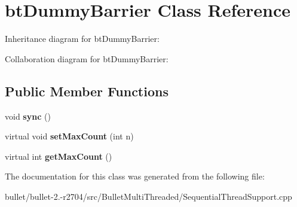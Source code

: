 \hypertarget{classbt_dummy_barrier}{\section{bt\+Dummy\+Barrier Class Reference}
\label{classbt_dummy_barrier}
}


Inheritance diagram for bt\+Dummy\+Barrier\+:


Collaboration diagram for bt\+Dummy\+Barrier\+:
\subsection*{Public Member Functions}
\begin{DoxyCompactItemize}
\item 
\hypertarget{classbt_dummy_barrier_a7ec421533b085380df3c7147bcfaa61c}{void {\bfseries sync} ()}\label{classbt_dummy_barrier_a7ec421533b085380df3c7147bcfaa61c}

\item 
\hypertarget{classbt_dummy_barrier_a44bb32b5a5e2feb46628c47491b731a1}{virtual void {\bfseries set\+Max\+Count} (int n)}\label{classbt_dummy_barrier_a44bb32b5a5e2feb46628c47491b731a1}

\item 
\hypertarget{classbt_dummy_barrier_a0525b963816e305510dde5f8ea26e20b}{virtual int {\bfseries get\+Max\+Count} ()}\label{classbt_dummy_barrier_a0525b963816e305510dde5f8ea26e20b}

\end{DoxyCompactItemize}


The documentation for this class was generated from the following file\+:\begin{DoxyCompactItemize}
\item 
bullet/bullet-\/2.-\/r2704/src/\+Bullet\+Multi\+Threaded/Sequential\+Thread\+Support.\+cpp\end{DoxyCompactItemize}

